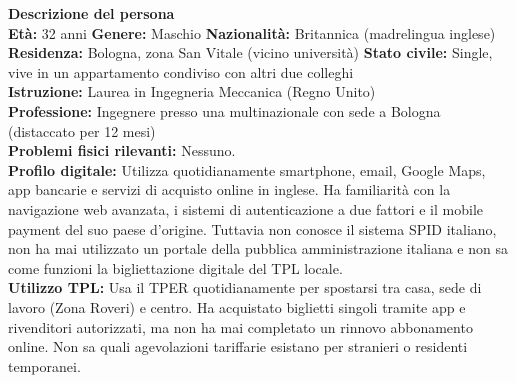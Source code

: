 \documentclass[11pt,a4paper]{article}
\begin{document}
\begin{tcolorbox}[colback=backgroundColor,colframe=borderColor,arc=2mm]
    \textbf{Descrizione del persona} \\[4pt]
    {\small
    \textbf{Et\`a:} 32 anni \hfill
    \textbf{Genere:} Maschio \hfill
    \textbf{Nazionalit\`a:} Britannica (madrelingua inglese) \\[2pt]
    \textbf{Residenza:} Bologna, zona San Vitale (vicino universit\`a) \hfill
    \textbf{Stato civile:} Single, vive in un appartamento condiviso con altri due colleghi \\[2pt]
    \textbf{Istruzione:} Laurea in Ingegneria Meccanica (Regno Unito) \\[2pt]
    \textbf{Professione:} Ingegnere presso una multinazionale con sede a Bologna (distaccato per 12 mesi) \\[2pt]
    \textbf{Problemi fisici rilevanti:} Nessuno. \\[2pt]
    \textbf{Profilo digitale:} Utilizza quotidianamente smartphone, email, Google Maps, app bancarie e servizi di acquisto online in inglese. Ha familiarit\`a con la navigazione web avanzata, i sistemi di autenticazione a due fattori e il mobile payment del suo paese d'origine. Tuttavia non conosce il sistema SPID italiano, non ha mai utilizzato un portale della pubblica amministrazione italiana e non sa come funzioni la bigliettazione digitale del TPL locale. \\[2pt]
    \textbf{Utilizzo TPL:} Usa il TPER quotidianamente per spostarsi tra casa, sede di lavoro (Zona Roveri) e centro. Ha acquistato biglietti singoli tramite app e rivenditori autorizzati, ma non ha mai completato un rinnovo abbonamento online. Non sa quali agevolazioni tariffarie esistano per stranieri o residenti temporanei.
    }
\end{tcolorbox}

\newpage

\end{document}
